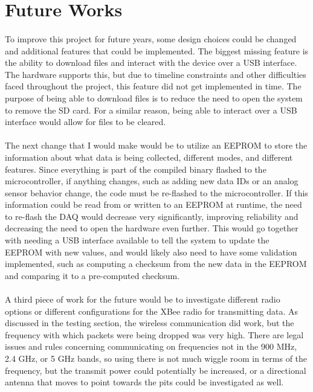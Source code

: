 \section{Future Works}

\paragraph{}
To improve this project for future years, some design choices could be changed and additional features that could be implemented.
The biggest missing feature is the ability to download files and interact with the device over a USB interface.
The hardware supports this, but due to timeline constraints and other difficulties faced throughout the project, this feature did not get implemented in time.
The purpose of being able to download files is to reduce the need to open the system to remove the SD card.
For a similar reason, being able to interact over a USB interface would allow for files to be cleared.

\paragraph{}
The next change that I would make would be to utilize an EEPROM to store the information about what data is being collected, different modes, and different features.
Since everything is part of the compiled binary flashed to the microcontroller, if anything changes, such as adding new data IDs or an analog sensor behavior change, the code must be re-flashed to the microcontroller.
If this information could be read from or written to an EEPROM at runtime, the need to re-flash the DAQ would decrease very significantly, improving reliability and decreasing the need to open the hardware even further.
This would go together with needing a USB interface available to tell the system to update the EEPROM with new values, and would likely also need to have some validation implemented, such as computing a checksum from the new data in the EEPROM and comparing it to a pre-computed checksum.

\paragraph{}
A third piece of work for the future would be to investigate different radio options or different configurations for the XBee radio for transmitting data.
As discussed in the testing section, the wireless communication did work, but the frequency with which packets were being dropped was very high.
There are legal issues and rules concerning communicating on frequencies not in the 900 MHz, 2.4 GHz, or 5 GHz bands, so using there is not much wiggle room in terms of the frequency, but the transmit power could potentially be increased, or a directional antenna that moves to point towards the pits could be investigated as well.

